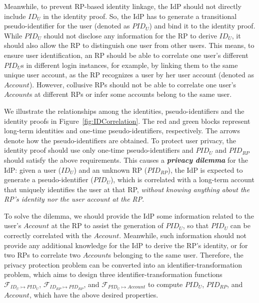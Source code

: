 Meanwhile, to prevent RP-based identity linkage, the IdP should not directly include $ID_U$ in the identity proof. So, the IdP has to generate a transitional pseudo-identifier for the user (denoted as $PID_U$) and bind it to the identity proof. While $PID_U$ should not disclose any information for the RP to derive $ID_U$, it should also allow the RP to distinguish one user from other users. This means, to ensure user identification, an RP should be able to correlate one user's different $PID_U$s in different login instances, for example, by linking them to the same unique user account, as the RP recognizes a user by her user account (denoted as $Account$). However, collusive RPs should not be able to correlate one user's $Account$s at different RPs or infer some accounts belong to the same user.

We illustrate the relationships among the identities, pseudo-identifiers and the identity proofs in Figure~\ref{fig:IDCorrelation}. The red and green blocks represent long-term identities and one-time pseudo-identifiers, respectively. The arrows denote how the pseudo-identifiers are obtained. To protect user privacy, the identity proof should use only one-time pseudo-identifiers and $PID_U$ and $PID_{RP}$ should satisfy the above requirements. This causes a \textbf{\em privacy dilemma} for the IdP: given a user ($ID_U$) and an unknown RP ($PID_{RP}$), the IdP is expected to generate a pseudo-identifier ($PID_{U}$), which is correlated with a long-term account that uniquely identifies the user at that RP, {\em without knowing anything about the RP's identity nor the user account at the RP}.

To solve the dilemma, we should provide the IdP some information related to the user's $Account$ at the RP to assist the generation of $PID_U$, so that $PID_U$ can be correctly correlated with the $Account$. Meanwhile, such information should not provide any additional knowledge for the IdP to derive the RP's identity, or for two RPs to correlate two $Account$s belonging to the same user. Therefore, the privacy protection problem can be converted into an identifier-transformation problem, which aims to design three identifier-transformation functions $\mathcal{F}_{ID_{U} \mapsto PID_U}$, $\mathcal{F}_{ID_{RP} \mapsto PID_{RP}}$, and $\mathcal{F}_{PID_{U} \mapsto Account}$ to compute $PID_U$, $PID_{RP}$, and $Account$, which have the above desired properties.

